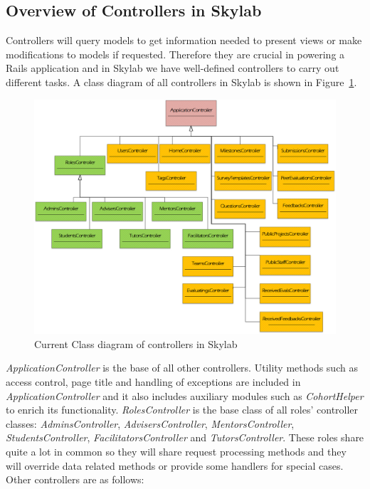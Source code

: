 \subsection{Overview of Controllers in Skylab}

Controllers will query models to get information needed to present views or make modifications to models if requested. Therefore they are crucial in powering a Rails application and in Skylab we have well-defined controllers to carry out different tasks. A class diagram of all controllers in Skylab is shown in Figure~\ref{fig:SkylabControllers}.

\begin{figure}[h]
  \centering
  \includegraphics[width=\textwidth]{Images/Skylab_Controllers.png}
  \caption{Current Class diagram of controllers in Skylab}
  \label{fig:SkylabControllers}
\end{figure}

\textit{ApplicationController} is the base of all other controllers. Utility methods such as access control, page title and handling of exceptions are included in \textit{ApplicationController} and it also includes auxiliary modules such as \textit{CohortHelper} to enrich its functionality. \textit{RolesController} is the base class of all roles' controller classes: \textit{AdminsController}, \textit{AdvisersController}, \textit{MentorsController}, \textit{StudentsController}, \textit{FacilitatorsController} and \textit{TutorsController}. These roles share quite a lot in common so they will share request processing methods and they will override data related methods or provide some handlers for special cases. Other controllers are as follows:

